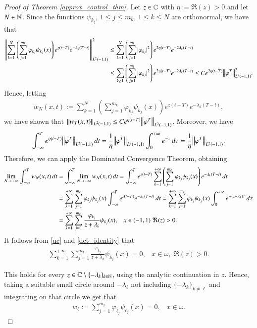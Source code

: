 \begin{proof}[Proof of Theorem \ref{approx_control_thm}]
Let $z\in\mathbb{C}$ with $\eta:=\Re(z)>0$ and let $N\in\mathbb{N}$. Since the functions $\psi_{k_j}$, $1\leq j\leq m_k$, $1\leq k\leq N$ are orthonormal, we have that
\begin{align*}
	{\left\|\sum_{k=1}^N \left(\sum_{j=1}^{m_k} \varphi_{k_j}\psi_{k_j}(x)\right)e^{z(t-T)}e^{-\lambda_k(T-t)}\right\|}_{L^2(-1,1)}^2 & \leq \sum_{k=1}^N \left(\sum_{j=1}^{m_k} |\varphi_{k_j}|^2\right)e^{2\eta(t-T)}e^{-2\lambda_k(T-t)}
	\\
	& \leq \sum_{k\geq 1} \left(\sum_{j=1}^{m_k} |\varphi_{k_j}|^2\right)e^{2\eta(t-T)}e^{-2\lambda_k(T-t)} \leq Ce^{2\eta(t-T)}{\left\|\varphi^T\right\|}_{L^2(-1,1)}^2.
\end{align*}
Hence, letting 
\begin{align*}
	w_N(x,t):= \sum_{k=1}^N \left(\sum_{j=1}^{m_k} \varphi_{k_j}\psi_{k_j}(x)\right)e^{z(t-T)}e^{-\lambda_k(T-t)},
\end{align*}
we have shown that ${\left\|w_T(x,t)\right\|}_{L^2(-1,1)}\leq Ce^{\eta(t-T)}{\left\|\varphi^T\right\|}_{L^2(-1,1)}$. Moreover, we have
\begin{align*}
	\int_{-\infty}^T e^{\eta(t-T)}{\left\|\varphi^T\right\|}_{L^2(-1,1)}\,dt = \frac{1}{\eta}{\left\|\varphi^T\right\|}_{L^2(-1,1)}\int_0^{+\infty} e^{-\tau}\,d\tau = \frac{1}{\eta}{\left\|\varphi^T\right\|}_{L^2(-1,1)}.
\end{align*}
Therefore, we can apply the Dominated Convergence Theorem, obtaining
\begin{align}\label{dct_identity}
	\lim_{N\to+\infty}\int_{-\infty}^T w_N(x,t)\,dt &= \int_{-\infty}^T\lim_{N\to+\infty} w_N(x,t)\,dt = \int_{-\infty}^T e^{z(t-T)} \sum_{k=1}^{+\infty} \left(\sum_{j=1}^{m_k} \varphi_{k_j}\psi_{k_j}(x)\right)e^{-\lambda_k(T-t)}\,dt \notag
	\\
	&=\sum_{k=1}^{+\infty}\sum_{j=1}^{m_k} \varphi_{k_j}\psi_{k_j}(x) \int_{-\infty}^T e^{z(t-T)}e^{-\lambda_k(T-t)}\,dt =\sum_{k=1}^{+\infty}\sum_{j=1}^{m_k} \varphi_{k_j}\psi_{k_j}(x) \int_0^{+\infty} e^{-(z+\lambda_k)\tau}\,d\tau \notag
	\\
	&=\sum_{k=1}^{+\infty}\sum_{j=1}^{m_k} \frac{\varphi_{k_j}}{z+\lambda_k}\psi_{k_j}(x), \;\;\; x\in (-1,1)\;\Re(z)>0.
\end{align} 
It follows from \eqref{uc} and \eqref{dct_identity} that 
\begin{align*}
	\sum_{k=1}^{+\infty}\sum_{j=1}^{m_k} \frac{\varphi_{k_j}}{z+\lambda_k}\psi_{k_j}(x)=0, \;\;\; x\in\omega,\;\Re(z)>0.
\end{align*}

This holds for every $z\in\mathbb{C}\setminus\{-\lambda_k\}_{k\in\mathbb{N}}$, using the analytic continuation in $z$. Hence, taking a suitable small circle around $-\lambda_{\ell}$ not including $\{-\lambda_k\}_{k\neq\ell}$ and integrating on that circle we get that
\begin{align*}
	w_\ell:=\sum_{j=1}^{m_{\ell}} \varphi_{\ell_j}\psi_{\ell_j}(x)=0, \;\;\; x\in\omega.
\end{align*}
	

\end{proof}
